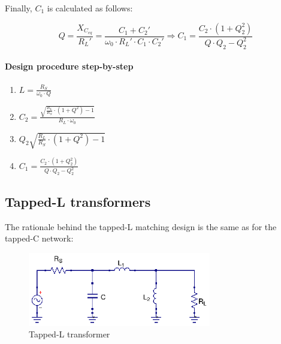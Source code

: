 \noindent Finally, $C_1$ is calculated as follows:

\begin{equation}
Q = \frac{X_{C_{eq}}}{R_L'} = \frac{C_1 + C_2'}{\omega_0 \cdot R_L' \cdot C_1 \cdot C_2'} \Longrightarrow C_1 = \frac{C_2 \cdot (1 + Q_2^2)}{Q \cdot Q_2 - Q_2^2}
\end{equation}

\paragraph{Design procedure step-by-step}

\begin{enumerate}
  \item $L = \frac{R_S}{\omega_0 \cdot Q}$
  \item $C_2 = \frac{\sqrt{\frac{R_L}{R_S} \cdot (1 + Q^2) - 1 }}{R_L \cdot \omega_0}$
  \item $Q_2 \sqrt{\frac{R_L}{R_S} \cdot (1 + Q^2) - 1}$
  \item $C_1 = \frac{C_2 \cdot (1 + Q_2^2)}{Q \cdot Q_2 - Q_2^2}$
\end{enumerate}


\subsection{Tapped-L transformers}
\noindent The rationale behind the tapped-L matching design is the same as for the tapped-C network:

\begin{figure}[H]
\centering
\includegraphics[width=80mm]{./images/Synthesis/Impedance_Matching/Tapped-L}
\caption{Tapped-L transformer}
\label{fig:tapped-c-transformer}
\end{figure}

